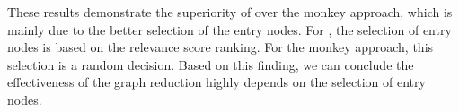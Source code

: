 These results demonstrate the superiority of \tool over the monkey approach,
which is mainly due to the better selection of the entry nodes.
For \tool, the selection of entry nodes is based on the relevance score ranking. 
For the monkey approach, this selection is a random decision. 
Based on this finding, we can conclude the effectiveness of the graph reduction highly depends on the selection of entry nodes. 



